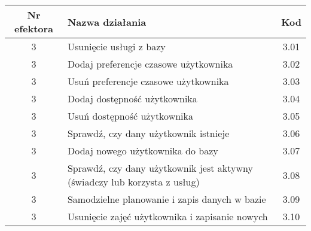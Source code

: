 \begin{tabular}{c|p{5cm}|c}
Nr efektora & Nazwa działania & Kod\\
\hline
3 & Usunięcie usługi z bazy & 3.01\\
3 & Dodaj preferencje czasowe użytkownika & 3.02\\
3 & Usuń preferencje czasowe użytkownika & 3.03\\
3 & Dodaj dostępność użytkownika & 3.04\\
3 & Usuń dostępność użytkownika & 3.05\\
3 & Sprawdź, czy dany użytkownik istnieje & 3.06\\
3 & Dodaj nowego użytkownika do bazy & 3.07\\
3 & Sprawdź, czy dany użytkownik jest aktywny (świadczy lub korzysta z usług) & 3.08\\
3 & Samodzielne planowanie i zapis danych w bazie & 3.09\\
3 & Usunięcie zajęć użytkownika i zapisanie nowych & 3.10\\
\end{tabular}



